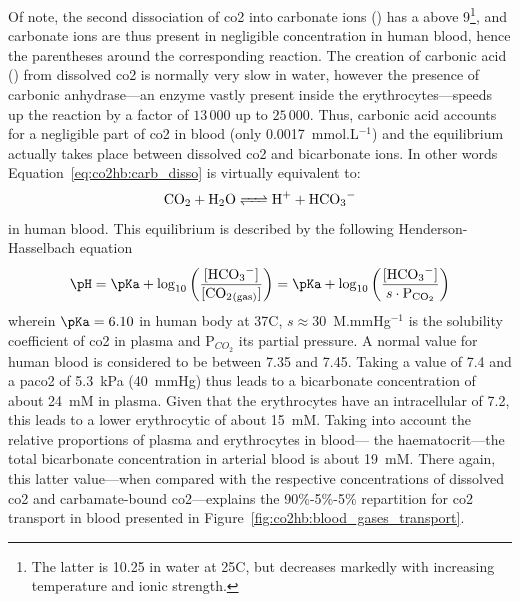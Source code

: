Of note, the second dissociation of \gls{co2} into carbonate ions () has a \pKa{} above 9\footnote{The latter is 10.25 in water at 25{\degree}C, but decreases markedly with increasing temperature and ionic strength\cite{hastings1925, macinnes1933}.}, and carbonate ions are thus present in negligible concentration in human blood, hence the parentheses around the corresponding reaction. The creation of carbonic acid () from dissolved \gls{co2} is normally very slow in water, however the presence of carbonic anhydrase---an enzyme vastly present inside the erythrocytes---speeds up the reaction by a factor of $13\,000$ up to $25\,000$\cite{levitzky2003pulmonary}\cite{geers2000}. Thus, carbonic acid accounts for a negligible part of \gls{co2} in blood (only 0.0017~mmol.L$^{-1}$\cite[Table~10.2]{nunns}) and the equilibrium actually takes place between dissolved \gls{co2} and bicarbonate ions. In other words Equation~\ref{eq:co2hb:carb_disso} is virtually equivalent to:
\begin{equation}\label{eq:co2hb:carb_disso_eq}
	\ce{CO2 + H2O <=> H+ + HCO3-}
\end{equation}
in human blood. This equilibrium is described by the following Henderson-Hasselbach equation
\begin{equation}\label{hh_eq_co2}
	\pH = \pKa + \log_{10} \left( \frac{\ce{[HCO_3^-]}}{\ce{[CO2_{(gas)}]}} \right) = \pKa + \log_{10} \left( \frac{\ce{[HCO_3^-]}}{s \cdot \mathrm{P}_{\ce{CO_2}}} \right)
\end{equation}
wherein $\pKa=6.10$ in human body at 37{\degree}C\cite{messier1975, geers2000}, $s \approx 30$~{\textmu}M.mmHg$^{-1}$ is the solubility coefficient of \gls{co2} in plasma\cite[Table~10.1]{nunns} and P$_{CO_2}$ its partial pressure. A normal \pH{} value for human blood is considered to be between 7.35 and 7.45\cite{rossana}. Taking a \pH{} value of 7.4 and a \gls{paco2} of 5.3~kPa (40~mmHg) thus leads to a bicarbonate concentration \ce{[HCO3^-]} of about 24~mM in plasma. Given that the erythrocytes have an intracellular \pH{} of 7.2\cite{kummerow2000, jensen2004}, this leads to a lower erythrocytic \ce{[HCO3^-]} of about 15~mM. Taking into account the relative proportions of plasma and erythrocytes in blood---\ie{} the haematocrit---the total bicarbonate concentration in arterial blood is about 19~mM. There again, this latter value---when compared with the respective concentrations of dissolved \gls{co2} and carbamate-bound \gls{co2}---explains the 90\%-5\%-5\% repartition for \gls{co2} transport in blood presented in Figure~\ref{fig:co2hb:blood_gases_transport}.


